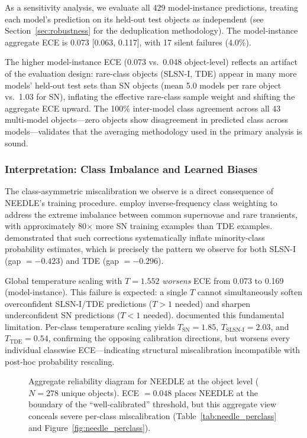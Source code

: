 \documentclass[twocolumn]{aastex631}
\begin{document}
As a sensitivity analysis, we evaluate all 429 model-instance predictions, treating each model's prediction on its held-out test objects as independent (see Section~\ref{sec:robustness} for the deduplication methodology). The model-instance aggregate ECE is 0.073 [0.063, 0.117], with 17 silent failures (4.0\%).

The higher model-instance ECE (0.073 vs.\ 0.048 object-level) reflects an artifact of the evaluation design: rare-class objects (SLSN-I, TDE) appear in many more models' held-out test sets than SN objects (mean 5.0 models per rare object vs.\ 1.03 for SN), inflating the effective rare-class sample weight and shifting the aggregate ECE upward. The 100\% inter-model class agreement across all 43 multi-model objects---zero objects show disagreement in predicted class across models---validates that the averaging methodology used in the primary analysis is sound.

\subsubsection{Interpretation: Class Imbalance and Learned Biases} \label{sec:needle_interp}

The class-asymmetric miscalibration we observe is a direct consequence of NEEDLE's training procedure. \citet{sheng2024} employ inverse-frequency class weighting to address the extreme imbalance between common supernovae and rare transients, with approximately 80$\times$ more SN training examples than TDE examples. \citet{vandengoorbergh2022} demonstrated that such corrections systematically inflate minority-class probability estimates, which is precisely the pattern we observe for both SLSN-I (gap $= -0.423$) and TDE (gap $= -0.296$).

Global temperature scaling with $T = 1.552$ \emph{worsens} ECE from 0.073 to 0.169 (model-instance). This failure is expected: a single $T$ cannot simultaneously soften overconfident SLSN-I/TDE predictions ($T > 1$ needed) and sharpen underconfident SN predictions ($T < 1$ needed). \citet{kull2019} documented this fundamental limitation. Per-class temperature scaling yields $T_{\text{SN}} = 1.85$, $T_{\text{SLSN-I}} = 2.03$, and $T_{\text{TDE}} = 0.54$, confirming the opposing calibration directions, but worsens every individual classwise ECE---indicating structural miscalibration incompatible with post-hoc probability rescaling.

\begin{figure}
\caption{Aggregate reliability diagram for NEEDLE at the object level ($N = 278$ unique objects). ECE $= 0.048$ places NEEDLE at the boundary of the ``well-calibrated'' threshold, but this aggregate view conceals severe per-class miscalibration (Table~\ref{tab:needle_perclass} and Figure~\ref{fig:needle_perclass}). \label{fig:needle_aggregate}}
\end{figure}
\end{document}
